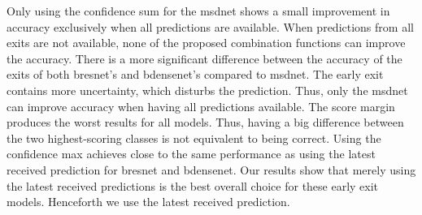 Only using the confidence sum for the \gls{msdnet} shows a small improvement in accuracy exclusively when all predictions are available. When predictions from all exits are not available, none of the proposed combination functions can improve the accuracy. There is a more significant difference between the accuracy of the exits of both \gls{bresnet}'s and \gls{bdensenet}'s compared to \gls{msdnet}. The early exit contains more uncertainty, which disturbs the prediction. Thus, only the \gls{msdnet} can improve accuracy when having all predictions available.
The score margin produces the worst results for all models. Thus, having a big difference between the two highest-scoring classes is not equivalent to being correct. Using the confidence max achieves close to the same performance as using the latest received prediction for \gls{bresnet} and \gls{bdensenet}. Our results show that merely using the latest received predictions is the best overall choice for these early exit models. Henceforth we use the latest received prediction.


